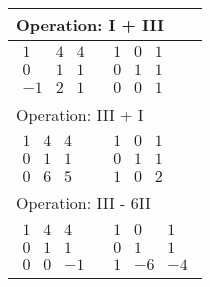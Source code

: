 \begin{longtable}{p{4cm}|p{3cm}}
    \multicolumn{2}{p{\dimexpr4cm+3cm+2\tabcolsep\relax}}{Operation: I + III}              \\\hline\pagebreak[0]

    $\displaystyle\begin{matrix}
                          1  & 4 & 4 \\
                          0  & 1 & 1 \\
                          -1 & 2 & 1
                      \end{matrix}$         &
    $\displaystyle\begin{matrix}
                          1 & 0 & 1 \\
                          0 & 1 & 1 \\
                          0 & 0 & 1
                      \end{matrix}$                                                            \\\hline

    \multicolumn{2}{p{\dimexpr4cm+3cm+2\tabcolsep\relax}}{Operation: III + I}              \\\hline\pagebreak[0]

    $\displaystyle\begin{matrix}
                          1 & 4 & 4 \\
                          0 & 1 & 1 \\
                          0 & 6 & 5
                      \end{matrix}$         &
    $\displaystyle\begin{matrix}
                          1 & 0 & 1 \\
                          0 & 1 & 1 \\
                          1 & 0 & 2
                      \end{matrix}$                                                            \\\hline

    \multicolumn{2}{p{\dimexpr4cm+3cm+2\tabcolsep\relax}}{Operation: III - 6II}            \\\hline\pagebreak[0]

    $\displaystyle\begin{matrix}
                          1 & 4 & 4  \\
                          0 & 1 & 1  \\
                          0 & 0 & -1
                      \end{matrix}$         &
    $\displaystyle\begin{matrix}
                          1 & 0  & 1  \\
                          0 & 1  & 1  \\
                          1 & -6 & -4
                      \end{matrix}$                                                            \\\hline


\end{longtable}
